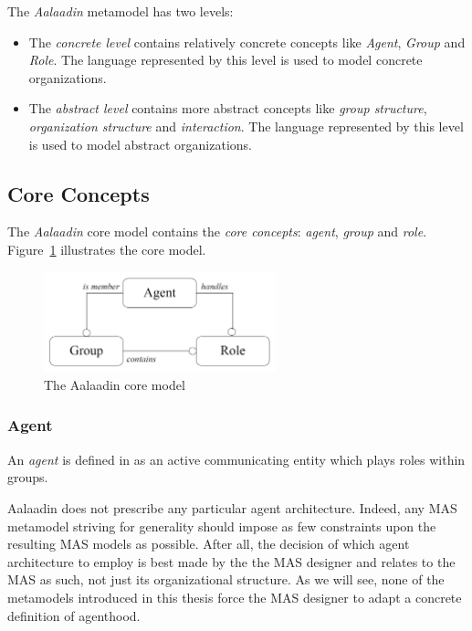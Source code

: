 The \textit{Aalaadin} metamodel has two levels:
\begin{itemize}
	\item The \textit{concrete level} contains relatively concrete concepts like \textit{Agent}, \textit{Group} and \textit{Role}.
	The language represented by this level is used to model concrete organizations.
	\item The \textit{abstract level} contains more abstract concepts like \textit{group structure}, \textit{organization structure} and \textit{interaction}.
	The language represented by this level is used to model abstract organizations.
\end{itemize}

\subsection{Core Concepts}

The \textit{Aalaadin} core model contains the \textit{core concepts}: \textit{agent}, \textit{group} and \textit{role}.
Figure~\ref{figure:aalaadin-core-model} illustrates the core model.

\begin{figure}[h]
	\centering
	\includegraphics[width=0.6\textwidth]{images/aalaadin/core-model.png}
	\caption{The Aalaadin core model \cite{Ferber97}}
	\label{figure:aalaadin-core-model}
\end{figure}

\subsubsection*{Agent}

An \textit{agent} is defined in \cite{Ferber97} as an active communicating entity which plays roles within groups.

Aalaadin does not prescribe any particular agent architecture.
Indeed, any MAS metamodel striving for generality should impose as few constraints upon the resulting MAS models as possible.
After all, the decision of which agent architecture to employ is best made by the the MAS designer and relates to the MAS as such, not just its organizational structure.
As we will see, none of the metamodels introduced in this thesis force the MAS designer to adapt a concrete definition of agenthood.

